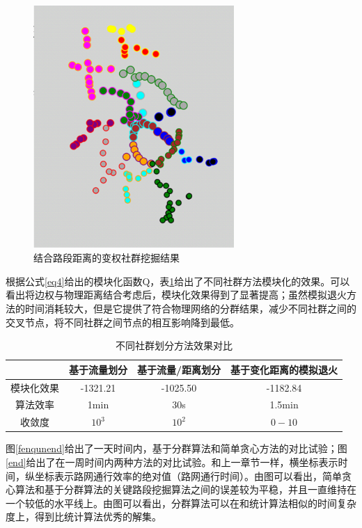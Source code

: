 				\begin{figure}
				\centering
				\includegraphics[width=3in]{picture/fenqunjieguo}
				\caption{结合路段距离的变权社群挖掘结果}
				\label{fenqun3}
				\end{figure}

		根据公式\ref{eq4}给出的模块化函数Q，表\ref{table10}给出了不同社群方法模块化的效果。可以看出将边权与物理距离结合考虑后，模块化效果得到了显著提高；虽然模拟退火方法的时间消耗较大，但是它提供了符合物理网络的分群结果，减少不同社群之间的交叉节点，将不同社群之间节点的相互影响降到最低。

				\begin{table}[h]
				\centering
				\begin{tabular}{|c|c|c|c|}
				\hline
				\hline
				   &   基于流量划分 &   基于流量/距离划分 &   基于变化距离的模拟退火  \\
				\hline
				  模块化效果 &   -1321.21 &   -1025.50 &   -1182.84  \\
				\hline
				  算法效率 &   1min &  30s   &   1.5min  \\
				\hline
				  收敛度 &   $10^3$ &   $10^2$ &   $0-10$  \\
				\hline
				\end{tabular}
				\caption{不同社群划分方法效果对比}
				\label{table10}
				\end{table} 



		图\ref{fenqunend}给出了一天时间内，基于分群算法和简单贪心方法的对比试验；图\ref{end}给出了在一周时间内两种方法的对比试验。和上一章节一样，横坐标表示时间，纵坐标表示路网通行效率的绝对值（路网通行时间）。由图可以看出，简单贪心算法和基于分群算法的关键路段挖掘算法之间的误差较为平稳，并且一直维持在一个较低的水平线上。由图可以看出，分群算法可以在和统计算法相似的时间复杂度上，得到比统计算法优秀的解集。


